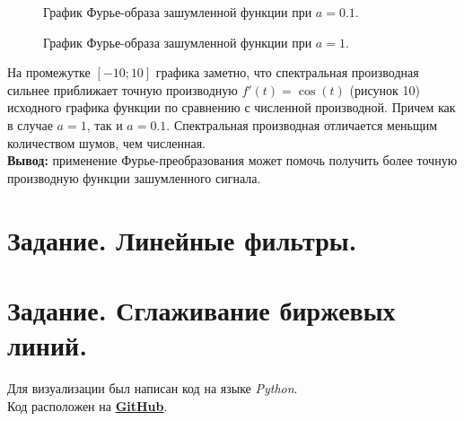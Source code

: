 \documentclass[a5paper, 10pt]{article}
\theoremstyle{definition}
\theoremstyle{plain}
\theoremstyle{remark}
\begin{document}
\begin{figure}[h!]
\caption{График Фурье-образа зашумленной функции при $a=0.1$.}
\caption{График Фурье-образа зашумленной функции при $a=1$.}
\end{figure}


На промежутке $[-10; 10]$ графика заметно, что спектральная производная сильнее приближает точную производную $f'(t) = \cos(t)$ (рисунок 10) исходного графика функции по сравнению с численной производной. Причем как в случае $a=1$, так и $a=0.1$. Спектральная производная отличается меньщим количеством шумов, чем численная.\\
\textbf{Вывод:} применение Фурье-преобразования может помочь получить более точную производную функции зашумленного сигнала.






\newpage
\section{Задание. Линейные фильтры.}







\newpage
\section{Задание. Сглаживание биржевых линий.}


\newpage
Для визуализации был написан код на языке \textit{Python}. \\
Код расположен на \href{https://github.com/a-nechaeva/practical_Linal/tree/main/lab4}{\textbf{GitHub}}.
\end{document}
